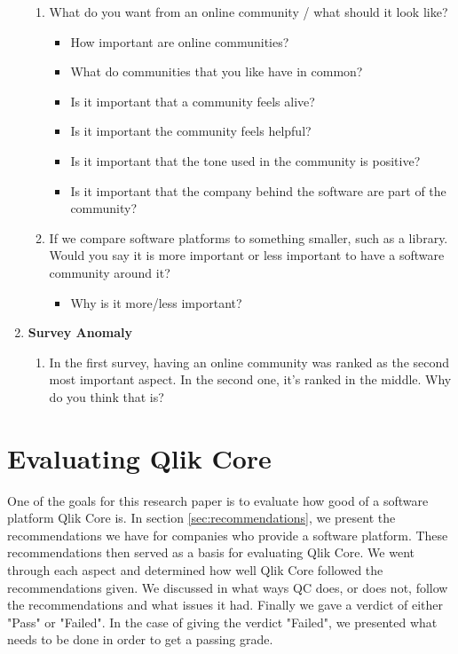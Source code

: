 \documentclass{cslthse-msc}
\begin{document}
\begin{enumerate}[label=C\Alph*]
        \begin{enumerate}[label=CC\arabic*]
            \item	What do you want from an online community / what should it look like?
            \begin{itemize}[label={-}]
                \item How important are online communities?
                \item What do communities that you like have in common?
                \item Is it important that a community feels alive?
                \item Is it important the community feels helpful?
                \item Is it important that the tone used in the community is positive?
                \item Is it important that the company behind the software are part of the community?
            \end{itemize}
            \item	If we compare software platforms to something smaller, such as a library. Would you say it is more important or less important to have a software community around it?
            \begin{itemize}[label={-}]
                \item Why is it more/less important?
            \end{itemize}
        \end{enumerate}
        \item \textbf{Survey Anomaly}
        \begin{enumerate}[label={CD\arabic*}]
            \item In the first survey, having an online community was ranked as the second most important aspect. In the second one, it’s ranked in the middle. Why do you think that is?
        \end{enumerate}
    \end{enumerate}

    \section{Evaluating Qlik Core}
    One of the goals for this research paper is to evaluate how good of a software platform Qlik Core is. In section \ref{sec:recommendations}, we present the recommendations we have for companies who provide a software platform. These recommendations then served as a basis for evaluating Qlik Core. We went through each aspect and determined how well Qlik Core followed the recommendations given. We discussed in what ways QC does, or does not, follow the recommendations and what issues it had. Finally we gave a verdict of either "Pass" or "Failed". In the case of giving the verdict "Failed", we presented what needs to be done in order to get a passing grade.
\end{document}
